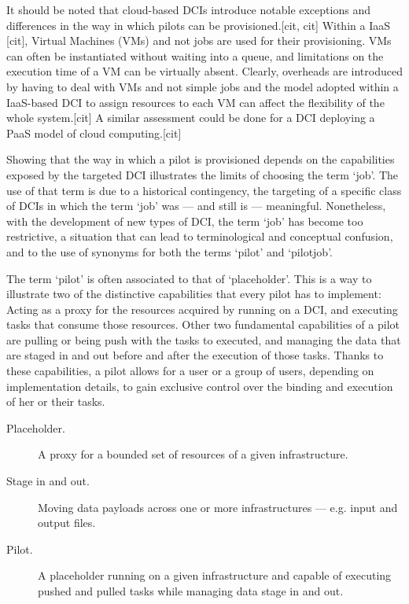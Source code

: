 \documentclass{sig-alternate}
\begin{document}
It should be noted that cloud-based DCIs introduce notable exceptions and differences in the way in which pilots can be provisioned.[cit, cit] Within a IaaS [cit], Virtual Machines (VMs) and not jobs are used for their provisioning. VMs can often be instantiated without waiting into a queue, and limitations on the execution time of a VM can be virtually absent. Clearly, overheads are introduced by having to deal with VMs and not simple jobs and the model adopted within a IaaS-based DCI to assign resources to each VM can affect the flexibility of the whole \pilotjob system.[cit] A similar assessment could be done for a DCI deploying a PaaS model of cloud computing.[cit]

Showing that the way in which a pilot is provisioned depends on the capabilities exposed by the targeted DCI illustrates the limits of choosing the term `job'. The use of that term is due to a historical contingency, the targeting of a specific class of DCIs in which the term `job' was --- and still is --- meaningful. Nonetheless, with the development of new types of DCI, the term `job' has become too restrictive, a situation that can lead to terminological and conceptual confusion, and to the use of synonyms for both the terms `pilot' and `pilotjob'.

The term `pilot' is often associated to that of `placeholder'. This is a way to illustrate two of the distinctive capabilities that every pilot has to implement: Acting as a proxy for the resources acquired by running on a DCI, and executing tasks that consume those resources. Other two fundamental capabilities of a pilot are pulling or being push with the tasks to executed, and managing the data that are staged in and out before and after the execution of those tasks. Thanks to these capabilities, a pilot allows for a user or a group of users, depending on implementation details, to gain exclusive control over the binding and execution of her or their tasks.

\begin{description}
  \item[Placeholder.] A proxy for a bounded set of resources of a given infrastructure.
  \item[Stage in and out.] Moving data payloads across one or more infrastructures --- e.g. input and output files.
  \item[Pilot.] A placeholder running on a given infrastructure and capable of executing pushed and pulled tasks while managing data stage in and out. 
\end{description}
\end{document}
